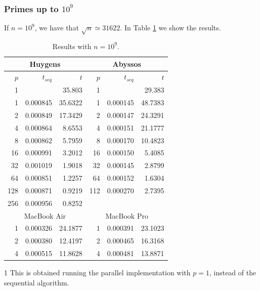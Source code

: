 \documentclass[a4paper,11pt]{article}
\begin{document}
\subsubsection{Primes up to $10^9$}

If $n=10^9$, we have that $\sqrt{n} \simeq 31622$. In Table \ref{tab:1e9} we show the results.

\begin{table}[H]
\begin{center}
\begin{threeparttable}
\begin{tabular}{|r r r|r r r|}
\hline
\multicolumn{3}{|c|}{Huygens} & \multicolumn{3}{c|}{Abyssos} \\
\hline
$p$ & $t_{seq}$ & $t$ & $p$ & $t_{seq}$ & $t$ \\
\hline
1 & & 35.803 & 1 & & 29.383 \\
1\tnote{1} & 0.000845  & 35.6322 &  1\tnote{1} & 0.000145 & 48.7383  \\
2 & 0.000849 & 17.3429 & 2 & 0.000147 & 24.3291 \\
4 & 0.000864 & 8.6553 & 4 & 0.000151 & 21.1777 \\
8 & 0.000862 & 5.7959 & 8 & 0.000170 &  10.4823\\
16 & 0.000991 & 3.2012 & 16 & 0.000150 & 5.4085\\
32 & 0.001019 & 1.9018 & 32 & 0.000145 & 2.8799\\
64 & 0.000851 & 1.2257 & 64 & 0.000152 & 1.6304\\
128 & 0.000871  & 0.9219 & 112 & 0.000270 & 2.7395\\
256 & 0.000956 & 0.8252 & & & \\
\hline
\multicolumn{3}{|c|}{MacBook Air} & \multicolumn{3}{c|}{MacBook Pro} \\
\hline
1\tnote{1} & 0.000326 & 24.1877 & 1\tnote{1} & 0.000391  & 23.1023\\
2 & 0.000380 & 12.4197 &  2 &  0.000465 & 16.3168 \\
4 & 0.000515 & 11.8628 & 4 &  0.000481 & 13.8871 \\
\hline
\end{tabular}
\begin{tablenotes}
\item [1] \small{This is obtained running the parallel implementation with $p=1$, instead of the sequential algorithm.}
\end{tablenotes}
\end{threeparttable}
\caption{Results with $n=10^9$.} \label{tab:1e9}
\end{center}
\end{table}
\end{document}

